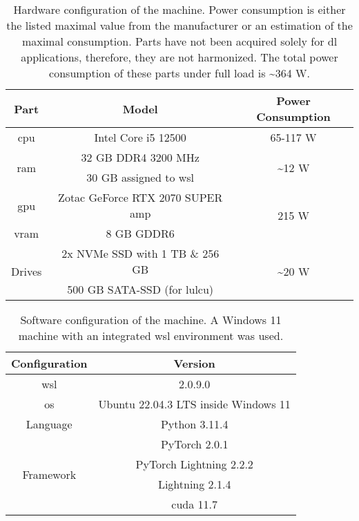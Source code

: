 \begin{table}[htb]
    \centering
    \caption[Machine Configuration - Hardware]{Hardware configuration of the machine. Power consumption is either the listed maximal value from the manufacturer or an estimation of the maximal consumption. Parts have not been acquired solely for \gls{dl} applications, therefore, they are not harmonized. The total power consumption of these parts under full load is \~{}364 W.}
    \begin{tabular}{ccc}
        \toprule
        \textbf{Part}              & \textbf{Model}                    & \textbf{Power Consumption} \\
        \midrule
        \gls{cpu}                  & Intel Core i5 12500               & 65-117 W \\
        \multirow{2}{*}{\gls{ram}} & 32 GB DDR4 3200 MHz               & \multirow{2}{*}{\~{}12 W} \\
                                   & 30 GB assigned to \gls{wsl}       & \\
        \gls{gpu}                  & Zotac GeForce RTX 2070 SUPER amp  & \multirow{2}{*}{215 W} \\
        \gls{vram}                 & 8 GB GDDR6                        & \\
        \multirow{2}{*}{Drives}    & 2x NVMe SSD with 1 TB \& 256 GB   & \multirow{2}{*}{\~{}20 W} \\
                                   & 500 GB SATA-SSD (for \gls{lulcu}) & \\
        \bottomrule
    \end{tabular}
    \label{tab:hardwareconfig}    
\end{table}

\begin{table}[htb]
    \centering
    \caption[Machine Configuration - Software]{Software configuration of the machine. A Windows 11 machine with an integrated \gls{wsl} environment was used.}
    \begin{tabular}{cc}
        \toprule
        \textbf{Configuration}     & \textbf{Version} \\
        \midrule
        \gls{wsl}                  & 2.0.9.0 \\
        \gls{os}                   & Ubuntu 22.04.3 LTS inside Windows 11 \\
        Language                   & Python 3.11.4 \\
        \multirow{4}{*}{Framework} & PyTorch 2.0.1 \\
                                   & PyTorch Lightning 2.2.2 \\
                                   & Lightning 2.1.4 \\
                                   & \gls{cuda} 11.7 \\
        \bottomrule
    \end{tabular}
    \label{tab:softwareconfig}    
\end{table}

